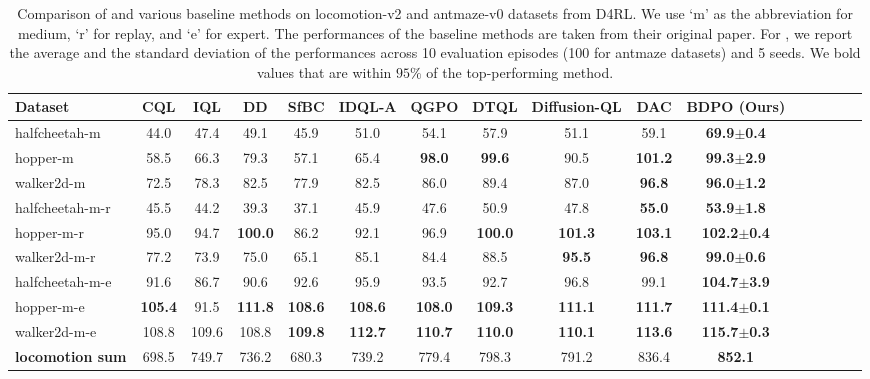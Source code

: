 
\begin{table*}[h!]
\centering
\setlength{\tabcolsep}{1.1mm}{}
\caption{Comparison of \algbb and various baseline methods on locomotion-v2 and antmaze-v0 datasets from D4RL. We use `m' as the abbreviation for medium, `r' for replay, and `e' for expert. The performances of the baseline methods are taken from their original paper. For \algbb, we report the average and the standard deviation of the performances across 10 evaluation episodes (100 for antmaze datasets) and 5 seeds. We bold values that are within $95\%$ of the top-performing method.}
\label{tab:d4rl}
\small{
\begin{tabular}{lccccccccccccccc}
\toprule
\textbf{Dataset} & \textbf{CQL} & \textbf{IQL} & \textbf{DD} & \textbf{SfBC} & \textbf{IDQL-A} & \textbf{QGPO} & \textbf{DTQL} & \textbf{Diffusion-QL}& \textbf{DAC} & \textbf{BDPO (Ours)}\\ 
\midrule
halfcheetah-m & 44.0 & 47.4 & 49.1 & 45.9 & 51.0 &  54.1 & 57.9 & 51.1 & 59.1 & \textbf{69.9$\pm$0.4}\\ 
hopper-m & 58.5 & 66.3 & 79.3 & 57.1 & 65.4 & \textbf{98.0} & \textbf{99.6} & 90.5 & \textbf{101.2} & \textbf{99.3$\pm$2.9}\\ 
walker2d-m & 72.5 & 78.3 & 82.5 & 77.9 & 82.5 & 86.0 & 89.4 & 87.0 & \textbf{96.8} & \textbf{96.0$\pm$1.2}\\ 
halfcheetah-m-r & 45.5 & 44.2 & 39.3 & 37.1 & 45.9 & 47.6 & 50.9 & 47.8 &\textbf{55.0} & \textbf{53.9$\pm$1.8}\\ 
hopper-m-r & 95.0 & 94.7 & \textbf{100.0} & 86.2 & 92.1 & 96.9 & \textbf{100.0} & 
\textbf{101.3} & \textbf{103.1} & \textbf{102.2$\pm$0.4}\\ 
walker2d-m-r & 77.2 & 73.9 & 75.0 & 65.1 & 85.1 & 84.4 & 88.5 & \textbf{95.5} & \textbf{96.8} & \textbf{99.0$\pm$0.6}\\ 
halfcheetah-m-e & 91.6 & 86.7 & 90.6 & 92.6 & 95.9 & 93.5 & 92.7 & 96.8 &99.1  &  \textbf{104.7$\pm$3.9}\\ 
hopper-m-e & \textbf{105.4} & 91.5 & \textbf{111.8} & \textbf{108.6} & \textbf{108.6} & \textbf{108.0} & \textbf{109.3} & \textbf{111.1} & \textbf{111.7} & \textbf{111.4$\pm$0.1}\\ 
walker2d-m-e & 108.8 & 109.6 & 108.8 & \textbf{109.8} & \textbf{112.7} & \textbf{110.7} & \textbf{110.0} & \textbf{110.1} & \textbf{113.6} & \textbf{115.7$\pm$0.3}\\ 
\midrule
\textbf{locomotion sum} & 698.5 & 749.7 & 736.2 & 680.3 & 739.2 & 779.4 & 798.3 & 791.2 &836.4 & \textbf{852.1}\\ 

\end{tabular}}
\end{table*}
